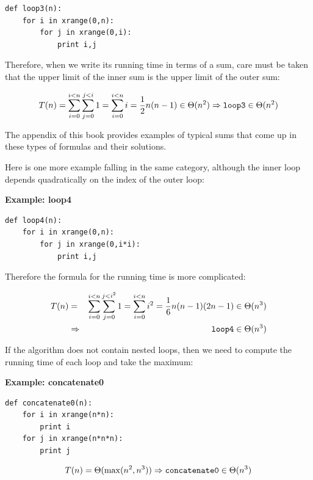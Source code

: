 \documentclass[justified,sixbynine]{tufte-book}
\def\subsubsection#1{{\bf #1}}
\theoremstyle{plain}%
\theoremstyle{definition}
\theoremstyle{remark}
\begin{document}
\begin{fullwidth}
\begin{lstlisting}
def loop3(n):
    for i in xrange(0,n):
        for j in xrange(0,i):
            print i,j
\end{lstlisting}

Therefore, when we write its running time in terms of a sum, care must be taken that the upper limit of the inner sum is the upper limit of the outer sum:

\begin{equation}
T(n)=\sum_{i=0}^{i<n}\sum_{j=0}^{j<i}1=\sum_{i=0}^{i<n}i=\frac 12n(n-1)\in
\Theta (n^2)\Rightarrow \text{{\tt loop3}}\in \Theta (n^2)
\end{equation}

The appendix of this book provides examples of typical sums that come up in these types of formulas and their solutions.

Here is one more example falling in the same category, although the inner loop depends quadratically on the index of the outer loop:

\subsubsection{Example: loop4}
\begin{lstlisting}
def loop4(n):
    for i in xrange(0,n):
        for j in xrange(0,i*i):
            print i,j
\end{lstlisting}

Therefore the formula for the running time is more complicated:

\begin{eqnarray}
T(n) &=&\sum_{i=0}^{i<n}\sum_{j=0}^{j<i^2}1=\sum_{i=0}^{i<n}i^2=\frac
16n(n-1)(2n-1)\in \Theta (n^3) \\
&\Rightarrow &\text{{\tt loop4}}\in \Theta (n^3)
\end{eqnarray}

If the algorithm does not contain nested loops, then we need to compute the running time of each loop and take the maximum:

\subsubsection{Example: concatenate0}
\begin{lstlisting}
def concatenate0(n):
    for i in xrange(n*n):
        print i
    for j in xrange(n*n*n):
        print j
\end{lstlisting}

\begin{equation}
T(n)=\Theta (\max (n^2,n^3))\Rightarrow \text{{\tt concatenate0}}\in \Theta
(n^3)
\end{equation}


\end{fullwidth}
\end{document}
